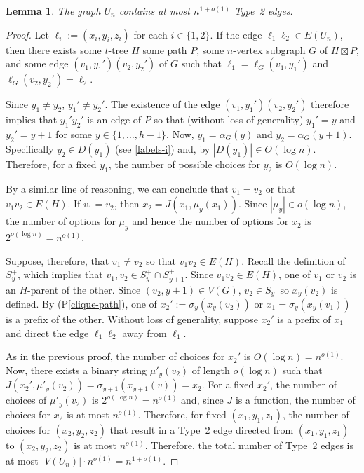 \documentclass{patmorin}
\newcommand{\pref}[1]{(P\ref{#1})}
\newtheorem{lemma}{Lemma}
\begin{document}
\begin{lemma}\label{vertical-edges}
    The graph $U_n$ contains at most $n^{1+o(1)}$ Type~2 edges.
\end{lemma}

\begin{proof}
    Let $\ell_i:=(x_i,y_i,z_i)$ for each $i\in\{1,2\}$.  If the edge $\ell_1\ell_2\in E(U_n)$, then there exists some $t$-tree $H$ some path $P$, some $n$-vertex subgraph $G$ of $H\boxtimes P$, and some edge $(v_1,y_1')(v_2,y_2')$ of $G$ such that $\ell_1=\ell_G(v_1,y_1')$ and $\ell_G(v_2,y_2')=\ell_2$.

    Since $y_1\neq y_2$, $y_1'\neq y_2'$.
    The existence of the edge $(v_1,y_1')(v_2,y_2')$ therefore implies that $y_1'y_2'$ is an edge of $P$ so that (without loss of generality) $y_1'=y$ and $y_2'=y+1$ for some $y\in\{1,\ldots,h-1\}$.  Now, $y_1=\alpha_G(y)$ and $y_2=\alpha_G(y+1)$.  Specifically $y_2\in D(y_1)$ (see \cref{labels-i}) and, by $|D(y_1)|\in O(\log n)$.  Therefore, for a fixed $y_1$, the number of possible choices for $y_2$ is $O(\log n)$.

    By a similar line of reasoning, we can conclude that $v_1=v_2$ or that $v_1v_2\in E(H)$.  If $v_1=v_2$, then $x_2=J(x_1,\mu_y(x_1))$. Since $|\mu_y|\in o(\log n)$, the number of options for $\mu_y$ and hence the number of options for $x_2$ is $2^{o(\log n)}=n^{o(1)}$.

    Suppose, therefore, that $v_1\neq v_2$ so that $v_1v_2\in E(H)$.  Recall the definition of $S^+_y$, which implies that $v_1,v_2\in S^+_y\cap S^+_{y+1}$.  Since $v_1v_2\in E(H)$, one of $v_1$ or $v_2$ is an $H$-parent of the other. Since $(v_2,y+1)\in V(G)$, $v_2\in S^+_y$ so $x_y(v_2)$ is defined. By \pref{clique-path}, one of $x_2':=\sigma_y(x_y(v_2))$ or $x_1=\sigma_y(x_y(v_1))$ is a prefix of the other.  Without loss of generality, suppose $x_2'$ is a prefix of $x_1$ and direct the edge $\ell_1\ell_2$ away from $\ell_1$.

    As in the previous proof, the number of choices for $x_2'$ is $O(\log n)=n^{o(1)}$.
    Now, there exists a binary string $\mu'_y(v_2)$ of length $o(\log n)$ such that $J(x_2',\mu'_y(v_2))=\sigma_{y+1}(x_{y+1}(v))=x_2$.  For a fixed $x_2'$, the number of choices of $\mu'_y(v_2)$ is $2^{o(\log n)}=n^{o(1)}$ and, since $J$ is a function, the number of choices for $x_2$ is at most $n^{o(1)}$.  Therefore, for fixed $(x_1,y_1,z_1)$, the number of choices for $(x_2,y_2,z_2)$ that result in a Type~2 edge directed from $(x_1,y_1,z_1)$ to $(x_2,y_2,z_2)$ is at most $n^{o(1)}$.  Therefore, the total number of Type~2 edges is at most $|V(U_n)|\cdot n^{o(1)} = n^{1+o(1)}$.
\end{proof}
\end{document}
